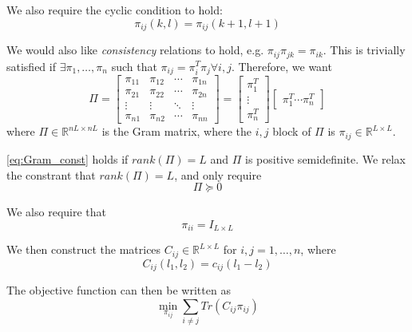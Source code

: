 \documentclass[12pt]{article}
\begin{document}
We also require the cyclic condition to hold:
\begin{equation} \label{eq:cyclic_const}
\pi_{ij}(k,l) = \pi_{ij}(k+1, l+1)
\end{equation}

We would also like {\em consistency} relations to hold, e.g. $\pi_{ij} \pi_{jk} = \pi_{ik}$.
%
This is trivially satisfied if $\exists \pi_1, \dots, \pi_n$ such that $\pi_{ij} = \pi_i^T \pi_j \forall i, j$. 
%
Therefore, we want
\begin{equation} \label{eq:Gram_const}
\Pi = 
\begin{bmatrix}
\pi_{11} & \pi_{12} & \cdots & \pi_{1n} \\
\pi_{21} & \pi_{22} & \cdots  & \pi_{2n} \\
\vdots & \vdots & \ddots & \vdots \\
\pi_{n1} & \pi_{n2} & \cdots  & \pi_{nn} 
\end{bmatrix} = 
\begin{bmatrix}
\pi_1^T \\
\vdots \\
\pi_n^T 
\end{bmatrix}
\begin{bmatrix}
\pi_1^T \cdots \pi_n^T 
\end{bmatrix}
\end{equation}
where $\Pi \in \mathbb{R}^{nL \times nL}$ is the Gram matrix, where the $i,j$ block of $\Pi$ is $\pi_{ij} \in \mathbb{R}^{L \times L}$.

\eqref{eq:Gram_const} holds if $rank(\Pi) = L$ and $\Pi$ is positive semidefinite. 
%
We relax the constrant that $rank(\Pi) = L$, and only require  
\begin{equation} \label{eq:psd_const}
\Pi \succeq 0
\end{equation}

We also require that
\begin{equation} \label{eq:identity_const}
\pi_{ii} = I_{L \times L}
\end{equation}

We then construct the matrices $C_{ij}  \in \mathbb{R}^{L \times L}$ for $i, j= 1, \dots, n$, where
\begin{equation}
C_{ij}(l_1, l_2) = c_{ij}(l_1 - l_2)
\end{equation}

The objective function can then be written as
\begin{equation} \label{eq:one_cost}
\min_{\pi_{ij}} \sum_{i \ne j} Tr(C_{ij} \pi_{ij})
\end{equation}
\end{document}
